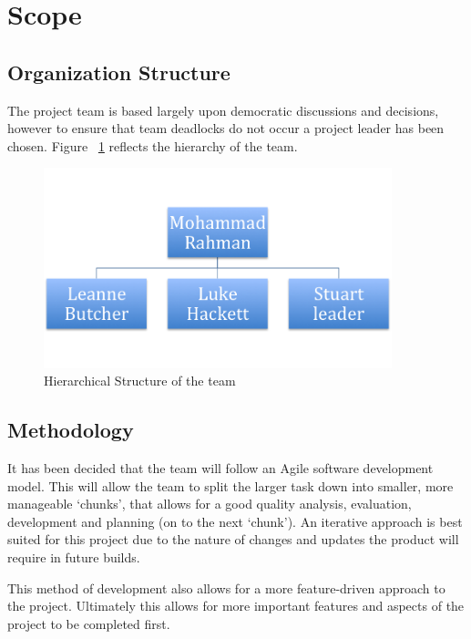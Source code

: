 \section{Scope}


\subsection{Organization Structure}

The project team is based largely upon democratic discussions and decisions,
however to ensure that team deadlocks do not occur a project leader has been
chosen. Figure ~\ref{fig:org_hierachy} reflects the hierarchy of the team.

\begin{figure}[H]
	\centering
	\includegraphics[width=0.9\textwidth]{org_hierachy.png}
	\caption{Hierarchical Structure of the team}
	\label{fig:org_hierachy}
\end{figure}


\subsection{Methodology}

It has been decided that the team will follow an Agile software development
model. This will allow the team to split the larger task down into smaller, more
manageable `chunks', that allows for a good quality analysis, evaluation,
development and planning (on to the next `chunk'). An iterative approach is best
suited for this project due to the nature of changes and updates the product
will require in future builds.

This method of development also allows for a more feature-driven approach to the
project. Ultimately this allows for more important features and aspects of the
project to be completed first.

